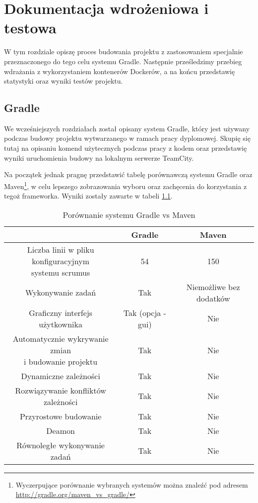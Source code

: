 \chapter{Dokumentacja wdrożeniowa i testowa}
W tym rozdziale opiszę proces budowania projektu z zastosowaniem specjalnie przeznaczonego do tego celu systemu Gradle. Następnie prześledzimy przebieg wdrażania z wykorzystaniem kontenerów Dockerów, a na końcu przedstawię statystyki oraz wyniki testów projektu.

\section{Gradle}
We wcześniejszych rozdziałach został opisany system Gradle, który jest używany podczas budowy projektu wytwarzanego w ramach pracy dyplomowej. Skupię się tutaj na opisaniu komend użytecznych podczas pracy z kodem oraz przedstawię wyniki uruchomienia budowy na lokalnym serwerze TeamCity.

Na początek jednak pragnę przedstawić tabelę porównawczą systemu Gradle oraz Maven\footnote{Wyczerpujące porównanie wybranych systemów można znaleźć pod adresem \url{http://gradle.org/maven_vs_gradle/}}, w celu lepszego zobrazowania wyboru oraz zachęcenia do korzystania z tegoż frameworka. Wyniki zostały zawarte w tabeli \ref{tabela:gradle_vs_maven}.

\begin{table}[h!]
	\caption{Porównanie systemu Gradle vs Maven}
	\centering
	\begin{tabular}{|c|c|c|}
		\hline
		& Gradle & Maven \\
		\hline
		\specialcell{Liczba linii w pliku konfiguracyjnym\\ systemu scrumus} & 54 & 150 \\
		\hline		
		Wykonywanie zadań & Tak & Niemożliwe bez dodatków \\
		\hline		
		Graficzny interfejs użytkownika & Tak (opcja -gui) & Nie \\
		\hline		
		\specialcell{Automatycznie wykrywanie zmian\\ i budowanie projektu} & Tak & Nie \\
		\hline	
		Dynamiczne zależności & Tak & Nie \\
		\hline	
		Rozwiązywanie konfliktów zależności & Tak & Nie \\
		\hline	
		Przyrostowe budowanie & Tak & Nie \\
		\hline	
		Deamon & Tak & Nie \\
		\hline	
		Równoległe wykonywanie zadań & Tak & Nie \\
		\hline	
	\end{tabular}
	\label{tabela:gradle_vs_maven}
\end{table}


